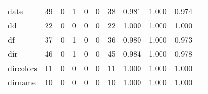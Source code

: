 \begin{longtable}{lp{1.2cm}p{1.2cm}p{1.2cm}p{1.2cm}p{1.2cm}p{1.2cm}p{1.2cm}p{1.2cm}p{1.2cm}p{1.2cm}}
date      &                                    39 &                                                  0 &                                                  1 &                                                  0 &                                                  0 &                                                 38 &                                              0.981 &                                              1.000 &                                              0.974 \\
dd        &                                    22 &                                                  0 &                                                  0 &                                                  0 &                                                  0 &                                                 22 &                                              1.000 &                                              1.000 &                                              1.000 \\
df        &                                    37 &                                                  0 &                                                  1 &                                                  0 &                                                  0 &                                                 36 &                                              0.980 &                                              1.000 &                                              0.973 \\
dir       &                                    46 &                                                  0 &                                                  1 &                                                  0 &                                                  0 &                                                 45 &                                              0.984 &                                              1.000 &                                              0.978 \\
dircolors &                                    11 &                                                  0 &                                                  0 &                                                  0 &                                                  0 &                                                 11 &                                              1.000 &                                              1.000 &                                              1.000 \\
dirname   &                                    10 &                                                  0 &                                                  0 &                                                  0 &                                                  0 &                                                 10 &                                              1.000 &                                              1.000 &                                              1.000 \\

\end{longtable}
